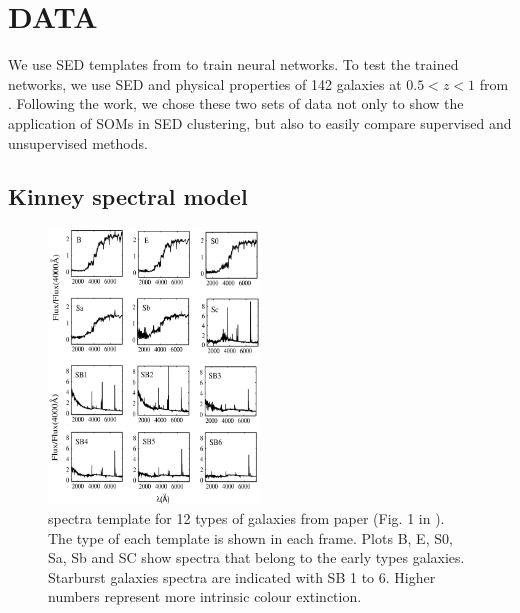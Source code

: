 
\section{DATA}
\label{sec: data}
We use SED templates from  to train neural networks.
To test the trained networks, we use SED and physical properties of 142 galaxies at $0.5<z<1$ from .
Following the  work, we chose these two sets of data not only to show the application of SOMs in SED clustering, but also to easily compare supervised and unsupervised methods.

 \subsection{Kinney spectral model}
     \begin{figure}
        \centering
        \includegraphics[width=0.5\textwidth]{images/k96.jpg}
        \caption{ spectra template for 12 types of galaxies from  paper (Fig. 1 in ). The type of each template is shown in each frame. Plots B, E, S0, Sa, Sb and SC show spectra that belong to the early types galaxies. Starburst galaxies spectra are indicated with SB 1 to 6. Higher numbers represent more intrinsic colour extinction.}
        \label{fig: k96}
    \end{figure}
      
